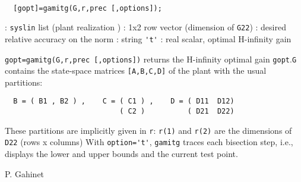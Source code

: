 \begin{mandesc}
   \\ %
\end{mandesc}
\begin{calling_sequence}
\begin{verbatim}
  [gopt]=gamitg(G,r,prec [,options]);  
\end{verbatim}
\end{calling_sequence}
\begin{parameters}
  \begin{varlist}
    : \verb!syslin! list (plant realization )
    : 1x2 row vector (dimension of \verb!G22!)
    : desired relative accuracy on the norm
    : string \verb!'t'!
    : real scalar, optimal H-infinity gain
  \end{varlist}
\end{parameters}
\begin{mandescription}
  \verb!gopt=gamitg(G,r,prec [,options])!
  returns the H-infinity optimal gain \verb!gopt!.\verb!G! contains the state-space matrices \verb![A,B,C,D]! of
  the plant with the usual partitions:
\begin{verbatim}
  B = ( B1 , B2 ) ,    C = ( C1 ) ,    D = ( D11  D12)
                           ( C2 )          ( D21  D22)
\end{verbatim}
  These partitions are implicitly given in \verb!r!: \verb!r(1)!
  and \verb!r(2)! are the dimensions of \verb!D22! (rows x columns)
  With \verb!option='t'!, \verb!gamitg! traces each bisection step, i.e., 
  displays the lower and upper bounds and the current test point.
\end{mandescription}
\begin{manseealso}
     
\end{manseealso}
\begin{authors}
  P. Gahinet
\end{authors}
